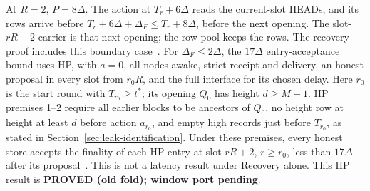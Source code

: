 \documentclass{article}
\theoremstyle{plain}
\theoremstyle{definition}
\theoremstyle{remark}
\begin{document}
At $R=2$, $P=8\Delta$.  The action at $T_r+6\Delta$ reads the
current-slot HEADs, and its rows arrive before $T_r+6\Delta+\Delta_F\leq T_r+8\Delta$, before
the next opening.  The slot-$rR+2$ carrier is that next opening;
the row pool keeps the rows.  The recovery proof includes this boundary
case~\cite[H.21]{BPH}.  For $\Delta_F\leq2\Delta$, the $17\Delta$ entry-acceptance bound uses
HP, with $a=0$, all nodes awake, strict receipt and delivery, an honest
proposal in every slot from $r_0R$, and the full interface for its
chosen delay.  Here $r_0$ is the start round with $T_{r_0}\geq t^*$;
its opening $Q_0$ has height $d\geq M+1$.  HP premises 1--2 require
all earlier blocks to be ancestors of $Q_0$, no height row at height
at least $d$ before action $a_{r_0}$, and empty high records just before
$T_{r_0}$, as stated in Section~\ref{sec:leak-identification}.
Under these premises, every honest store accepts the finality of each
HP entry at slot $rR+2$, $r\geq r_0$, less than $17\Delta$ after its
proposal~\cite[HP]{BPF}.  This is not a latency result under Recovery
alone.  This HP result is \textbf{PROVED (old fold); window port pending}.
\end{document}
